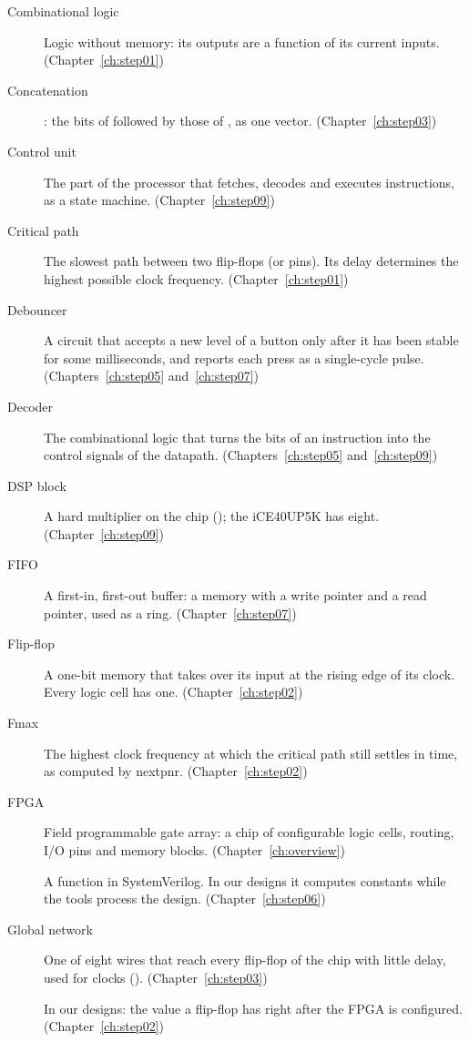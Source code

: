 \begin{description}
\item[Combinational logic] Logic without memory: its outputs are a function
  of its current inputs. (Chapter~\ref{ch:step01})
\item[Concatenation] : the bits of  followed by those of
  , as one vector. (Chapter~\ref{ch:step03})
\item[Control unit] The part of the processor that fetches, decodes and
  executes instructions, as a state machine. (Chapter~\ref{ch:step09})
\item[Critical path] The slowest path between two flip-flops (or pins). Its
  delay determines the highest possible clock frequency.
  (Chapter~\ref{ch:step01})
\item[Debouncer] A circuit that accepts a new level of a button only after
  it has been stable for some milliseconds, and reports each press as a
  single-cycle pulse. (Chapters~\ref{ch:step05} and~\ref{ch:step07})
\item[Decoder] The combinational logic that turns the bits of an instruction
  into the control signals of the datapath. (Chapters~\ref{ch:step05}
  and~\ref{ch:step09})
\item[DSP block] A hard multiplier on the chip (); the
  iCE40UP5K has eight. (Chapter~\ref{ch:step09})
\item[FIFO] A first-in, first-out buffer: a memory with a write pointer and a
  read pointer, used as a ring. (Chapter~\ref{ch:step07})
\item[Flip-flop] A one-bit memory that takes over its input at the rising edge
  of its clock. Every logic cell has one. (Chapter~\ref{ch:step02})
\item[Fmax] The highest clock frequency at which the critical path still
  settles in time, as computed by nextpnr. (Chapter~\ref{ch:step02})
\item[FPGA] Field programmable gate array: a chip of configurable logic cells,
  routing, I/O pins and memory blocks. (Chapter~\ref{ch:overview})
\item[] A function in SystemVerilog. In our designs it computes
  constants while the tools process the design. (Chapter~\ref{ch:step06})
\item[Global network] One of eight wires that reach every flip-flop of the
  chip with little delay, used for clocks ().
  (Chapter~\ref{ch:step03})
\item[] In our designs: the value a flip-flop has right after the
  FPGA is configured. (Chapter~\ref{ch:step02})

\end{description}
